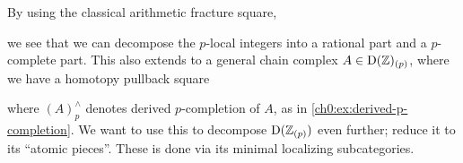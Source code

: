 



By using the classical arithmetic fracture square, 
\begin{center}
\end{center}
we see that we can decompose the $p$-local integers into a rational part and a $p$-complete part. This also extends to a general chain complex $A\in \mathrm{D}(\mathbb{Z})_{(p)}$, where we have a homotopy pullback square 
\begin{center}
\end{center}
where $(A)_p^\wedge$ denotes derived $p$-completion of $A$, as in \cref{ch0:ex:derived-p-completion}. We want to use this to decompose $\mathrm{D}(\mathbb{Z}_{(p)})$ even further; reduce it to its ``atomic pieces''. These is done via its minimal localizing subcategories. 

